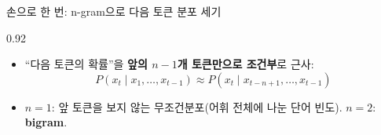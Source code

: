 \begin{frame}{손으로 한 번: n-gram으로 다음 토큰 분포 세기}
\begin{center}\begin{varwidth}{0.92\textwidth}
  \begin{itemize}
    
    \item ``다음 토큰의 확률''을 \textbf{앞의 $n-1$개 토큰만으로
      조건부}로 근사:
      \[P(x_t \mid x_1, \ldots, x_{t-1}) \approx
      P(x_t \mid x_{t-n+1}, \ldots, x_{t-1})\]
    \item $n=1$: 앞 토큰을 보지 않는 무조건분포(어휘 전체에
      나눈 단어 빈도). $n=2$: \textbf{bigram}.
    
  \end{itemize}
\end{varwidth}\end{center}
\end{frame}
